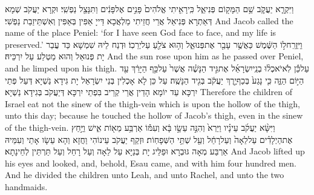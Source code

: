 {וַיִּקְרָ֧א יַעֲקֹ֛ב שֵׁ֥ם הַמָּק֖וֹם פְּנִיאֵ֑ל כִּֽי\maqqaf רָאִ֤יתִי אֱלֹהִים֙ פָּנִ֣ים אֶל\maqqaf פָּנִ֔ים וַתִּנָּצֵ֖ל נַפְשִֽׁי׃}
{וּקְרָא יַעֲקֹב שְׁמָא דְּאַתְרָא פְּנִיאֵל אֲרֵי חֲזֵיתִי מַלְאֲכָא דַּייָ אַפִּין בְּאַפִּין וְאִשְׁתֵּיזַבַת נַפְשִׁי׃}
{And Jacob called the name of the place Peniel: ‘for I have seen God face to face, and my life is preserved.’}{}
{וַיִּֽזְרַֽח\maqqaf ל֣וֹ הַשֶּׁ֔מֶשׁ כַּאֲשֶׁ֥ר עָבַ֖ר אֶת\maqqaf פְּנוּאֵ֑ל וְה֥וּא צֹלֵ֖עַ עַל\maqqaf יְרֵכֽוֹ׃}
{וּדְנַח לֵיהּ שִׁמְשָׁא כַּד עֲבַר יָת פְּנוּאֵל וְהוּא מַטְלַע עַל יִרְכֵּיהּ׃}
{And the sun rose upon him as he passed over Peniel, and he limped upon his thigh.}{}
{עַל\maqqaf כֵּ֡ן לֹֽא\maqqaf יֹאכְל֨וּ בְנֵֽי\maqqaf יִשְׂרָאֵ֜ל אֶת\maqqaf גִּ֣יד הַנָּשֶׁ֗ה אֲשֶׁר֙ עַל\maqqaf כַּ֣ף הַיָּרֵ֔ךְ עַ֖ד הַיּ֣וֹם הַזֶּ֑ה כִּ֤י נָגַע֙ בְּכַף\maqqaf יֶ֣רֶךְ יַעֲקֹ֔ב בְּגִ֖יד הַנָּשֶֽׁה׃}
{עַל כֵּן לָא אָכְלִין בְּנֵי יִשְׂרָאֵל יָת גִּידָא נַשְׁיָא דְּעַל פְּתֵי יִרְכָּא עַד יוֹמָא הָדֵין אֲרֵי קְרֵיב בִּפְתֵי יִרְכָּא דְּיַעֲקֹב בְּגִידָא נַשְׁיָא׃}
{Therefore the children of Israel eat not the sinew of the thigh-vein which is upon the hollow of the thigh, unto this day; because he touched the hollow of Jacob’s thigh, even in the sinew of the thigh-vein.}{}
\newperek
{}%
{וַיִּשָּׂ֨א יַעֲקֹ֜ב עֵינָ֗יו וַיַּרְא֙ וְהִנֵּ֣ה עֵשָׂ֣ו בָּ֔א וְעִמּ֕וֹ אַרְבַּ֥ע מֵא֖וֹת אִ֑ישׁ וַיַּ֣חַץ אֶת\maqqaf הַיְלָדִ֗ים עַל\maqqaf לֵאָה֙ וְעַל\maqqaf רָחֵ֔ל וְעַ֖ל שְׁתֵּ֥י הַשְּׁפָחֽוֹת׃}
{וּזְקַף יַעֲקֹב עֵינוֹהִי וַחֲזָא וְהָא עֵשָׂו אָתֵי וְעִמֵּיהּ אַרְבַּע מְאָה גּוּבְרָא וּפַלֵּיג יָת בְּנַיָּא עַל לֵאָה וְעַל רָחֵל וְעַל תַּרְתֵּין לְחֵינָתָא׃}
{And Jacob lifted up his eyes and looked, and, behold, Esau came, and with him four hundred men. And he divided the children unto Leah, and unto Rachel, and unto the two handmaids.}{}
